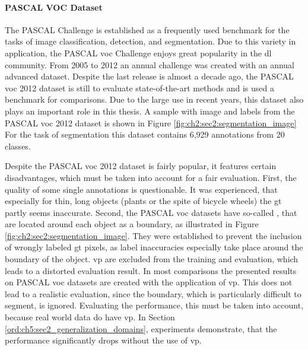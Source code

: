 \paragraph{PASCAL VOC Dataset}

The PASCAL  Challenge \cite{Eve20-PascalVOC} is established as a frequently used benchmark for the tasks of image classification, detection, and segmentation.
Due to this variety in application, the PASCAL \gls{voc} Challenge enjoys great popularity in the \gls{dl} community.
From 2005 to 2012 an annual challenge was created with an annual advanced dataset.
Despite the last release is almost a decade ago, the PASCAL \gls{voc} 2012 dataset is still to evaluate state-of-the-art methods and is used a benchmark for comparisons.
Due to the large use in recent years, this dataset also plays an important role in this thesis.
A sample with image and labels from the PASCAL \gls{voc} 2012 dataset is shown in Figure \ref{fig:ch2:sec2:segmentation_image}
For the task of segmentation this dataset contains 6,929 annotations from 20 classes.

Despite the PASCAL \gls{voc} 2012 dataset is fairly popular, it features certain disadvantages, which must be taken into account for a fair evaluation.
First, the quality of some single annotations is questionable.
It was experienced, that especially for thin, long objects (\eg plants or the spite of bicycle wheels) the \gls{gt} partly seems inaccurate.
Second, the PASCAL \gls{voc} datasets have so-called , that are located around each object as a boundary, as illustrated in Figure \ref{fig:ch2:sec2:segmentation_image}.
They were established to prevent the inclusion of wrongly labeled \gls{gt} pixels, as label inaccuracies especially take place around the boundary of the object.  
\gls{vp} are excluded from the training and evaluation, which leads to a distorted evaluation result.
In most comparisons the presented results on PASCAL \gls{voc} datasets are created with the application of \gls{vp}.
This does not lead to a realistic evaluation, since the boundary, which is particularly difficult to segment, is ignored.
Evaluating the performance, this must be taken into account, because real world data do have \gls{vp}. 
In Section \ref{ord:ch5:sec2_generalization_domains}, experiments demonstrate, that the performance significantly drops without the use of \gls{vp}.

